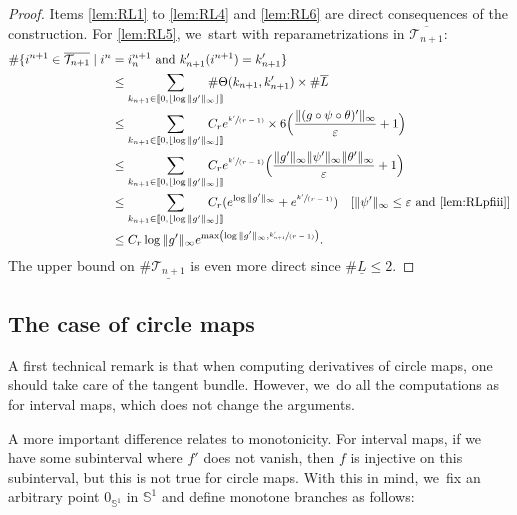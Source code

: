 \documentclass[10pt]{amsart}
\newcommand{\spfrac}[2]{\sfrac{#1}{(#2)}}
\theoremstyle{definition}
\newcommand{\bbS}{{\mathbb{S}}}
\begin{document}
\begin{proof}
Items \eqref{lem:RL1} to \eqref{lem:RL4} and \eqref{lem:RL6} are direct consequences of the construction. For \eqref{lem:RL5}, we~start with reparametrizations in $\overline{\mathcal{T}_{n+1}}$:
\begin{align*}
\# \{ i^{n+1} \in \overline{\mathcal{T}_{n+1}} \mid i^n &= i_n^{n+1} \text{ and } k_{n+1}'(i^{n+1}) = k_{n+1}' \}\\
&\leq \sum_{k_{n+1} \in [ \! [ 0, \lfloor \log \| g' \|_{\infty} \rfloor ]\!]} \hspace*{-5mm}\# \Theta(k_{n+1}, k'_{n+1}) \times \# \overline{L}\\
&\leq \sum_{k_{n+1} \in [ \! [ 0, \lfloor \log \| g' \|_{\infty} \rfloor ]\!]} \hspace*{-5mm}C_r e^{\spfrac{k'}{r-1}} \times 6 \Bigl (\frac{\| (g \circ \psi \circ \theta)' \|_{\infty}}{\varepsilon} + 1\Bigr)\\
&\leq \sum_{k_{n+1} \in [ \! [ 0, \lfloor \log \| g' \|_{\infty} \rfloor ]\!]} \hspace*{-5mm}C_r e^{\spfrac{k'}{r-1}} \Bigl (\frac{\| g' \|_{\infty} \| \psi' \|_{\infty} \| \theta' \|_{\infty}}{\varepsilon} + 1\Bigr)\\
&\leq \sum_{k_{n+1} \in [ \! [ 0, \lfloor \log \| g' \|_{\infty} \rfloor ]\!]} \hspace*{-5mm}C_r (e^{\log \| g' \|_{\infty}} + e^{\spfrac{k'}{r-1}})\quad[\| \psi' \|_{\infty} \leq \varepsilon \text{ and \eqref{lem:RLpfiii}}]\\
&\leq C_r \log \| g' \|_{\infty} e^{\max \left (\log \| g' \|_{\infty}, \spfrac{k_{n+1}'}{r-1} \right)}.
\end{align*}
The upper bound on $\# \underline{\mathcal{T}_{n+1}}$ is even more direct since $\# \underline{L} \leq 2$.
\end{proof}

\subsection{The case of circle maps}
\label{ssec:diff-int-cercle}

A first technical remark is that when computing derivatives of circle maps, one should take care of the tangent bundle.
However, we~do all the computations as for interval maps, which does not change the arguments.

A more important difference relates to monotonicity.
For interval maps, if we have some subinterval where $f'$ does not vanish, then $f$ is injective on this subinterval, but this is not true for circle maps.
With this in mind, we~fix an arbitrary point $0_{\bbS^1}$ in $\bbS^1$ and define monotone branches as follows:
\end{document}
